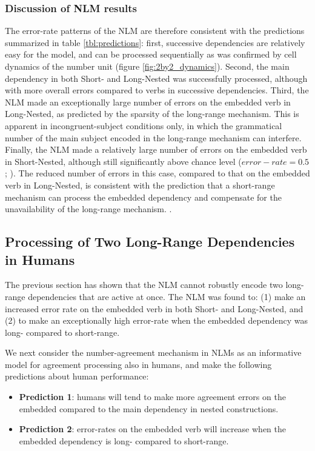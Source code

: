 \vspace{10pt}

\subsubsection{Discussion of NLM results}
The error-rate patterns of the NLM are therefore consistent with the predictions summarized in table \ref{tbl:predictions}: first, successive dependencies are relatively easy for the model, and can be processed sequentially as was confirmed by cell dynamics of the number unit (figure \ref{fig:2by2_dynamics}). Second, the main dependency in both Short- and Long-Nested was successfully processed, although with more overall errors compared to verbs in successive dependencies. Third, the NLM made an exceptionally large number of errors on the embedded verb in Long-Nested, as predicted by the sparsity of the long-range mechanism. This is apparent in incongruent-subject conditions only, in which the grammatical number of the main subject encoded in the long-range mechanism can interfere. Finally, the NLM made a relatively large number of errors on the embedded verb in Short-Nested, although still significantly above chance level ($error-rate = 0.5$; ). The reduced number of errors in this case, compared to that on the embedded verb in Long-Nested, is consistent with the prediction that a short-range mechanism can process the embedded dependency and compensate for the unavailability of the long-range mechanism. .

\subsection{Processing of Two Long-Range Dependencies in Humans}
The previous section has shown that the NLM cannot robustly encode two long-range dependencies that are active at once. The NLM was found to: (1) make an increased error rate on the embedded verb in both Short- and Long-Nested, and (2) to make an exceptionally high error-rate when the embedded dependency was long- compared to short-range. 

We next consider the number-agreement mechanism in NLMs as an informative model for agreement processing also in humans, and make the following predictions about human performance:

\begin{itemize}
    \item \textbf{Prediction 1}: humans will tend to make more agreement errors on the embedded compared to the main dependency in nested constructions. 
    \item \textbf{Prediction 2}: error-rates on the embedded verb will increase when the embedded dependency is long- compared to short-range.
\end{itemize}

